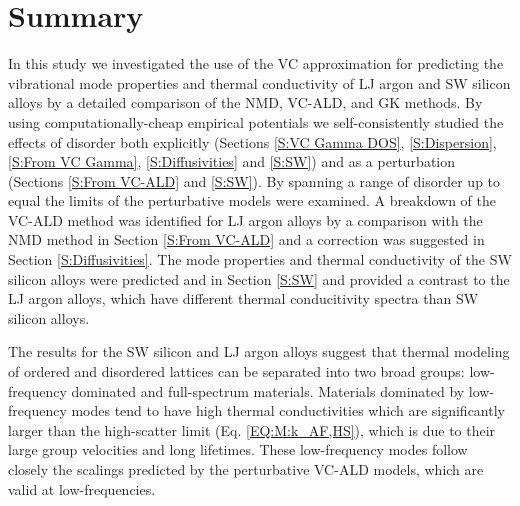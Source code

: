 \documentclass[aps,prb,onecolumn,preprint,footinbib,superscriptaddress,amsmath,amssymb,floatfix]{revtex4}
\begin{document}
\section{\label{S:Summary}Summary}

In this study we investigated the use of the VC 
approximation for predicting the vibrational mode properties and 
thermal conductivity of LJ argon and SW silicon alloys 
by a detailed comparison of the NMD, VC-ALD, and GK methods. 
By using computationally-cheap 
empirical potentials we self-consistently studied the effects of 
disorder both explicitly (Sections \ref{S:VC Gamma DOS}, 
\ref{S:Dispersion},  
\ref{S:From VC Gamma}, \ref{S:Diffusivities} and \ref{S:SW}) 
and as a perturbation (Sections \ref{S:From VC-ALD} and \ref{S:SW}). 
By spanning a range of disorder up to equal the limits of the 
perturbative models were examined.
A breakdown of the VC-ALD method was identified for LJ argon alloys 
by a comparison with the NMD method in 
Section \ref{S:From VC-ALD}   
and a correction was suggested in Section \ref{S:Diffusivities}. 
The mode properties and thermal 
conductivity of the SW silicon alloys were predicted and in 
Section \ref{S:SW} and provided a contrast to the 
LJ argon alloys, which have different thermal conducitivity 
spectra than SW silicon alloys. 

The results for the SW silicon and LJ argon alloys suggest that 
thermal modeling of ordered and 
disordered lattices can be separated into two broad groups: 
low-frequency dominated and full-spectrum materials.  
Materials dominated 
by low-frequency modes tend to have high thermal conductivities which  
are significantly larger than the 
high-scatter limit (Eq. \eqref{EQ:M:k_AF,HS}), 
which is due to their large group velocities and long lifetimes.
\cite{abeles_thermal_1962,abeles_lattice_1963,
kamitakahara_vibrations_1974,cahill_thermal_2004,
cahill_thermal_2005,garg_role_2011,lindsay_thermal_2012,
cheaito_experimental_2012} 
These low-frequency modes  
follow closely the scalings predicted by the perturbative VC-ALD 
models, which are valid at low-frequencies. 
\end{document}
